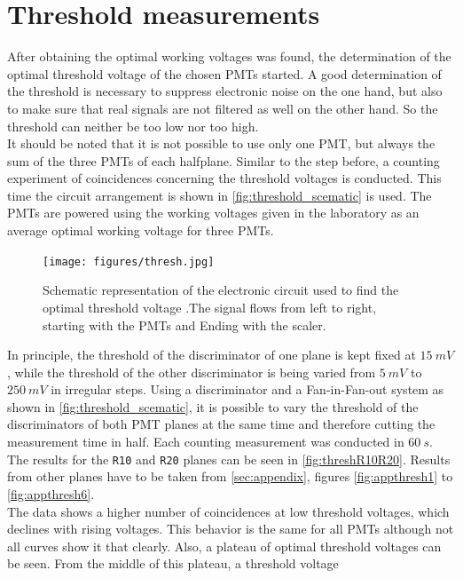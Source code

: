 \section{Threshold measurements}
After obtaining the optimal working voltages was found, the determination of the optimal 
threshold voltage of the chosen PMTs started. A good determination of the threshold is necessary 
to suppress electronic noise on the one hand, but also to make sure that real signals are not
 filtered as well on the other hand. So the threshold can neither be too low nor too high.\\
It should be noted that it is not possible to use only one PMT, but always the sum of the three PMTs
of each halfplane. 
 Similar to the step before, a counting experiment of coincidences concerning the threshold voltages is conducted. This time the circuit arrangement is shown in 
 \autoref{fig:threshold_scematic} is used. The PMTs are powered using the working voltages given 
 in the laboratory as an average optimal working voltage for three PMTs. \\
\begin{figure}
   \centering
   \texttt{[image: figures/thresh.jpg]}
   \caption{Schematic representation of the electronic circuit used to find the optimal threshold voltage
   .The signal flows from left to right, starting with the PMTs and Ending with the scaler.}
   \label{fig:threshold_scematic}
\end{figure}
In principle, the threshold of the discriminator of one plane is kept fixed at $\SI{15}{mV}$, while 
the threshold of the other discriminator is being varied from $\SI{5}{mV}$ to $\SI{250}{mV}$ in 
irregular steps. Using a discriminator and a Fan-in-Fan-out system as shown in \autoref{fig:threshold_scematic},
it is possible to vary the threshold of the discriminators of both PMT planes at the same time and therefore 
cutting the measurement time in half. Each counting measurement was conducted in $\SI{60}{s}$. \\ 
The results for the \texttt{R10} and \texttt{R20} planes can be seen in \autoref{fig:threshR10R20}.
Results from other planes have to be taken from \autoref{sec:appendix}, figures \autoref{fig:appthresh1} to \autoref{fig:appthresh6}.\\

The data shows a higher number of coincidences at low threshold voltages, which declines with rising voltages.
This behavior is the same for all PMTs although not all curves show it that clearly.  
Also, a plateau of optimal threshold voltages can be seen. From the middle of this plateau, a threshold voltage 
